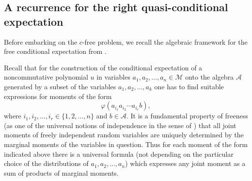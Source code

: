 \documentclass[12pt]{amsart}
\newcommand{\alg}[1]{\mathcal{#1}}
\theoremstyle{definition}
\newtheorem{remark}[theorem]{Remark}
\numberwithin{equation}{section}
\begin{document}

\subsection{A recurrence for the right quasi-conditional expectation}
Before embarking on the $c$-free problem,
we recall the algebraic framework for the free conditional expectation from
\cite{LehnerSzpojankowski:2023:freeint1}.

Recall that for the construction of the conditional expectation of
a noncommutative polynomial $u$
in variables $a_1,a_2,\ldots,a_n\in\alg{M}$ 
onto the algebra $\alg{A}$ generated by a subset of the variables
$a_1,a_2,\ldots,a_k$  one has to find suitable expressions for moments of the form 
\begin{equation*}
  \varphi\left(a_{i_1}a_{i_2}\dotsm a_{i_r} b\right),
\end{equation*}
where $i_1,i_2,\ldots,i_r\in \{1,2,\ldots,n\}$ and $b\in\alg{A}$.
It is a fundamental property of freeness
(as one of the  universal notions of independence in the sense of \cite{Muraki:2002:five})
that all joint moments of
freely independent random variables are uniquely determined by the marginal moments
of the variables in question. Thus for each moment of the form indicated above
there is a universal formula (not depending on the particular choice of the
distributions of $a_1,a_2,\ldots,a_n$) which expresses any joint moment as a sum
of products of marginal moments.
%
% 
  
\end{document}
